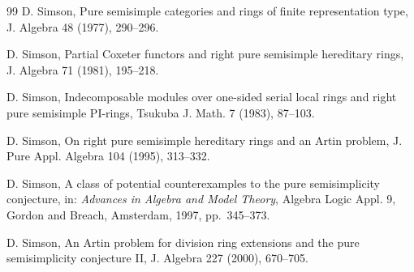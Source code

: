\documentclass[11pt,a4paper]{amsart}
\numberwithin{equation}{section}
\begin{document}
\begin{thebibliography}{99}
 D. Simson, Pure semisimple categories and rings of finite representation type, J. Algebra 48 (1977), 290--296.

 D. Simson, Partial Coxeter functors and right pure semisimple hereditary rings, J. Algebra 71 (1981), 195--218.

 D. Simson, Indecomposable modules over one-sided serial local rings and right pure semisimple PI-rings, Tsukuba J. Math. 7 (1983), 87--103.

 D. Simson, On right pure semisimple hereditary rings and an Artin problem, J. Pure Appl. Algebra 104 (1995), 313--332.

 D. Simson, A class of potential counterexamples to the pure semisimplicity conjecture, in: \emph{Advances in Algebra and Model Theory}, Algebra Logic Appl. 9, Gordon and Breach, Amsterdam, 1997, pp.~345--373.

 D. Simson, An Artin problem for division ring extensions and the pure semisimplicity conjecture II, J. Algebra 227 (2000), 670--705.

\end{thebibliography}
\end{document}
